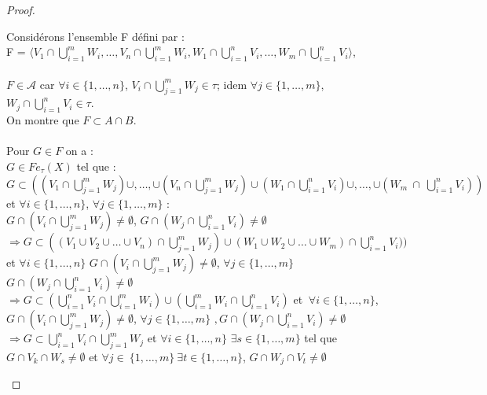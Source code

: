 \documentclass[11pt]{report}
\theoremstyle{styletheorem}
\theoremstyle{styledef}
\theoremstyle{remark}
\begin{document}
\begin{proof}
\begin{enumerate}
\begin{itemize}
			Considérons l'ensemble F défini par : \\
			F = $ \langle V_1 \cap \bigcup_{i=1}^{m} W_i, \dots, V_n \cap \bigcup_{i=1}^{m} W_i, W_1 \cap \bigcup_{i=1}^{n} V_i, \dots, W_{m} \cap \bigcup_{i=1}^{n} V_{i}\rangle $, \\ \\  $ F \in \mathcal{A}$ car $\forall i \in \lbrace 1,\dots,n \rbrace $, $V_i \cap \bigcup_{j=1}^m W_j \in \tau$; idem $ \forall j \in \lbrace 1,\dots,m \rbrace $, $W_j \cap \bigcup_{i=1}^n V_i \in \tau$.\\ 
			On montre que $F \subset A \cap B$.\\  \\
			Pour $ G \in F $ on a : \\ 
			$ G \in Fe_{\tau}(X) $ tel que :  \\
			$ G \subset ((V_1 \cap \bigcup_{j=1}^{m} W_j) \cup, \dots, \cup (V_n \cap \bigcup_{j=1}^{m} W_j) \cup (W_1 \cap \bigcup_{i=1}^{n} V_i)\cup , \dots,\cup(W_m ~\cap ~\bigcup_{i=1}^{n} V_i )) $ et $ \forall i \in \lbrace 1, \dots, n \rbrace $, $\forall j \in \lbrace 1, \dots, m \rbrace $ : \\ $ G \cap (V_i \cap \bigcup_{j=1}^{m} W_j) \neq \emptyset  $, $ G \cap (W_j \cap \bigcup_{i=1}^{n} V_i) \neq \emptyset  $\\
			$\Rightarrow G \subset ((V_1 \cup V_2 \cup \dots \cup V_n) \cap \bigcup_{j=1}^{m} W_j) \cup (W_1 \cup W_2 \cup \dots \cup W_m) \cap \bigcup_{i=1}^{n} V_i))$ et $ \forall i\in \lbrace 1, \dots, n \rbrace  $ $ G \cap (V_i \cap \bigcup_{j=1}^{m} W_j) \neq \emptyset  $, $\forall j \in \lbrace 1, \dots, m \rbrace $ $ G \cap (W_j \cap \bigcup_{i=1}^{n} V_i) \neq \emptyset   $ \\
			$\Rightarrow G \subset (\bigcup_{i=1}^{n} V_i \cap \bigcup_{i=1}^{m} W_i) \cup (\bigcup_{i=1}^{m} W_i \cap \bigcup_{i=1}^{n} V_i) $ et $ \ \forall i \in \lbrace 1, \dots, n \rbrace $, \\ $ G \cap (V_i \cap \bigcup_{j=1}^{m} W_j) \neq \emptyset  $, $\forall j \in \lbrace 1, \dots, m \rbrace$ $, G \cap (W_j \cap \bigcup_{i=1}^{n} V_i) \neq \emptyset  $\\ 
			$ \Rightarrow G \subset \bigcup_{i=1}^{n} V_{i} \cap \bigcup_{j=1}^{m} W_{j} $ et $ \forall i \in \lbrace 1, \dots, n \rbrace$ $\exists s \in \lbrace 1, \dots, m \rbrace $ tel que $ G \cap V_{k} \cap W_{s} \neq \emptyset $ et $ \forall j \in ~\lbrace 1, \dots, m \rbrace \ \exists t \in \lbrace 1, \dots, n \rbrace$,  $ G \cap W_{j} \cap V_{t} \neq \emptyset $\\

\end{itemize}
\end{enumerate}
\end{proof}
\end{document}
